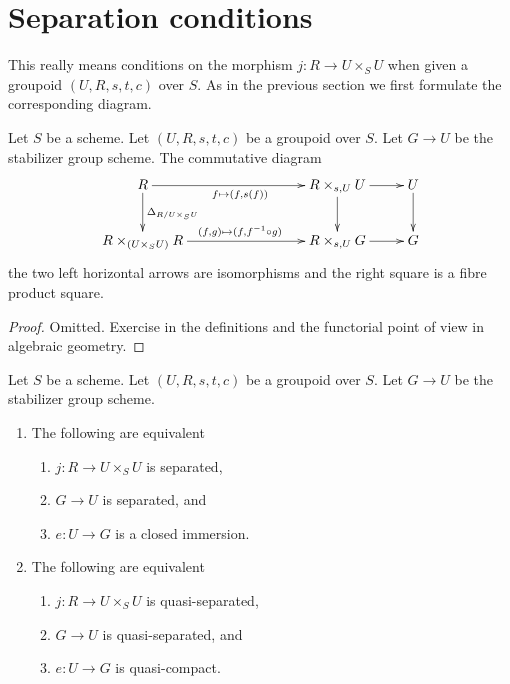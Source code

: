 \section{Separation conditions}
\label{section-separation}

\noindent
This really means conditions on the morphism $j : R \to U \times_S U$
when given a groupoid $(U, R, s, t, c)$ over $S$. As in the previous
section we first formulate the corresponding diagram.

\begin{lemma}
\label{lemma-diagram-diagonal}
Let $S$ be a scheme.
Let $(U, R, s, t, c)$ be a groupoid over $S$.
Let $G \to U$ be the stabilizer group scheme.
The commutative diagram
$$
\xymatrix{
R \ar[d]^{\Delta_{R/U \times_S U}} \ar[rrr]_{f \mapsto (f, s(f))} & & &
R \times_{s, U} U \ar[d] \ar[r] & U \ar[d] \\
R \times_{(U \times_S U)} R \ar[rrr]^{(f, g) \mapsto (f, f^{-1} \circ g)} & & &
R \times_{s, U} G \ar[r] & G
}
$$
the two left horizontal arrows are isomorphisms
and the right square is a fibre product square.
\end{lemma}

\begin{proof}
Omitted.
Exercise in the definitions and the functorial point of
view in algebraic geometry.
\end{proof}

\begin{lemma}
\label{lemma-diagonal}
Let $S$ be a scheme.
Let $(U, R, s, t, c)$ be a groupoid over $S$.
Let $G \to U$ be the stabilizer group scheme.
\begin{enumerate}
\item The following are equivalent
\begin{enumerate}
\item $j : R \to U \times_S U$ is separated,
\item $G \to U$ is separated, and
\item $e : U \to G$ is a closed immersion.
\end{enumerate}
\item The following are equivalent
\begin{enumerate}
\item $j : R \to U \times_S U$ is quasi-separated,
\item $G \to U$ is quasi-separated, and
\item $e : U \to G$ is quasi-compact.
\end{enumerate}
\end{enumerate}
\end{lemma}

